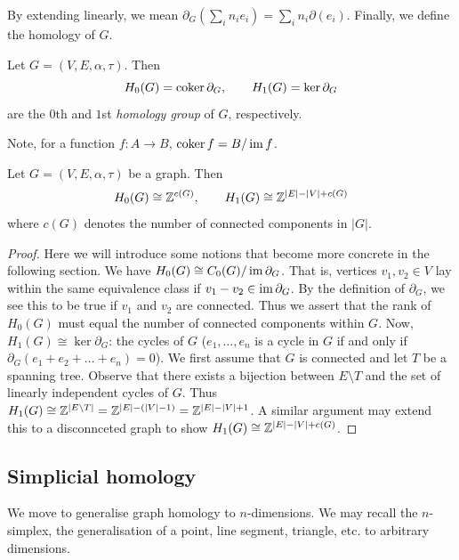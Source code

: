 By extending linearly, we mean $\partial_G(\sum_i n_i e_i) = \sum_i n_i \partial(e_i)$. Finally, we define the homology of $G$.

\begin{definition}
  Let $G = (V,E, \alpha, \tau)$. Then
  \[ H_0(G) = \operatorname{coker} \partial_G, \qquad H_1(G) = \ker \partial_G \]
  are the $0$th and $1$st \emph{homology group} of $G$, respectively.
\end{definition}

Note, for a function $f: A \to B$, $\operatorname{coker} f = B/\operatorname{im} f$.

\begin{proposition}
  Let $G = (V,E, \alpha, \tau)$ be a graph. Then
  \[ H_0(G) \cong \mathbb{Z}^{c(G)}, \qquad H_1(G) \cong \mathbb{Z}^{\lvert E \rvert - \lvert V \rvert + c(G)} \]
  where $c(G)$ denotes the number of connected components in $\lvert G \rvert$.
\end{proposition}

\begin{proof}
  Here we will introduce some notions that become more con\-crete in the follow\-ing section. We have $H_0(G) \cong C_0(G)/\operatorname{im} \partial_G$. That is, vertices $v_1, v_2 \in V$ lay within the same equivalence class if $v_1 - v_2 \in \operatorname{im} \partial_G$. By the definition of $\partial_G$, we see this to be true if $v_1$ and $v_2$ are connected. Thus we assert that the rank of $H_0(G)$ must equal the number of connected components within $G$. Now, $H_1(G) \cong \ker \partial_G$: the cycles of $G$ ($e_1, \ldots, e_n$ is a cycle in $G$ if and only if $\partial_G(e_1 + e_2 + \ldots + e_n) = 0$). We first assume that $G$ is connected and let $T$ be a spanning tree. Observe that there exists a bijection between $E \setminus T$ and the set of linearly independent cycles of $G$. Thus $H_1(G) \cong \mathbb{Z}^{\lvert E \setminus T \rvert} = \mathbb{Z}^{\lvert E \rvert - (\lvert V \rvert - 1)} = \mathbb{Z}^{\lvert E \rvert - \lvert V \rvert + 1}$. A similar argument may extend this to a disconnceted graph to show $H_1(G) \cong \mathbb{Z}^{\lvert E \rvert - \lvert V \rvert + c(G)}$.
\end{proof}

\subsection{Simplicial homology}

We move to generalise graph homology to $n$-dimensions. We may recall the $n$-simplex, the generalisation of a point, line segment, triangle, etc. to arbitrary dimensions.

